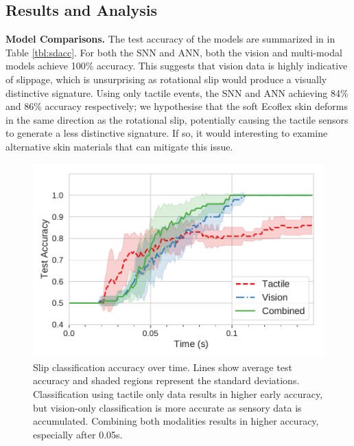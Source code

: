 \documentclass[fyp]{socreport}
\begin{document}
\subsection{Results and Analysis}

\vspace{0.3em}
\noindent\textbf{Model Comparisons.}
The test accuracy of the models are summarized in in Table \ref{tbl:sdacc}. For
both the SNN and ANN, both the vision and multi-modal models achieve 100\%
accuracy. This suggests that vision data is highly indicative of slippage, which
is unsurprising as rotational slip would produce a visually distinctive
signature. Using only tactile events, the SNN and ANN achieving 84\% and 86\%
accuracy respectively; we hypothesise that the soft Ecoflex skin deforms in the
same direction as the rotational slip, potentially causing the tactile sensors
to generate a less distinctive signature. If so, it would interesting to examine
alternative skin materials that can mitigate this issue.


\begin{figure}
\centering
\includegraphics[width=0.85\columnwidth]{images/analysis/slip_over_time.pdf}
\caption{Slip classification accuracy over time. Lines show average test
  accuracy and shaded regions represent the standard deviations. Classification
  using tactile only data results in higher early accuracy, but vision-only
  classification is more accurate as sensory data is accumulated. Combining both
  modalities results in higher accuracy, especially after 0.05s.}
\label{fig:sliptime}
\end{figure}
\end{document}
